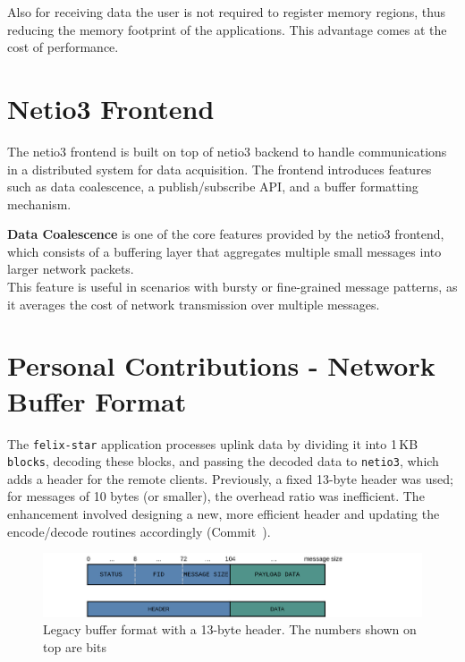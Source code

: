 Also for receiving data the user is not required to register memory regions, thus reducing the memory footprint of the applications. This advantage comes at the cost of performance.\\

\section{Netio3 Frontend}

The netio3 frontend is built on top of netio3 backend to handle communications in a distributed system for data acquisition. The frontend introduces features such as data coalescence, a publish/subscribe \acs{API}, and a buffer formatting mechanism.

\textbf{Data Coalescence} is one of the core features provided by the netio3 frontend, which consists of a buffering layer that aggregates multiple small messages into larger network packets.\\
This feature is useful in scenarios with bursty or fine-grained message patterns, as it averages the cost of network transmission over multiple messages.


\section{Personal Contributions - Network Buffer Format}

The \texttt{felix-star} application processes uplink data by dividing it into 1\,KB \texttt{blocks}, decoding these blocks, and passing the decoded data to \texttt{netio3}, which adds a header for the remote clients. 
Previously, a fixed 13-byte header was used; for messages of 10 bytes (or smaller), the overhead ratio was inefficient.
The enhancement involved designing a new, more efficient header and updating the encode/decode routines accordingly (Commit~\cite{netio3-header-commit}).\\

\begin{figure}[htbp]
\centering
\includegraphics[width=\textwidth]{images/contributions/old-buffer-format.png}
\caption[Legacy format of network buffer]{Legacy buffer format with a 13-byte header. The numbers shown on top are bits}
\label{fig:old-buffer-format}
\end{figure}

